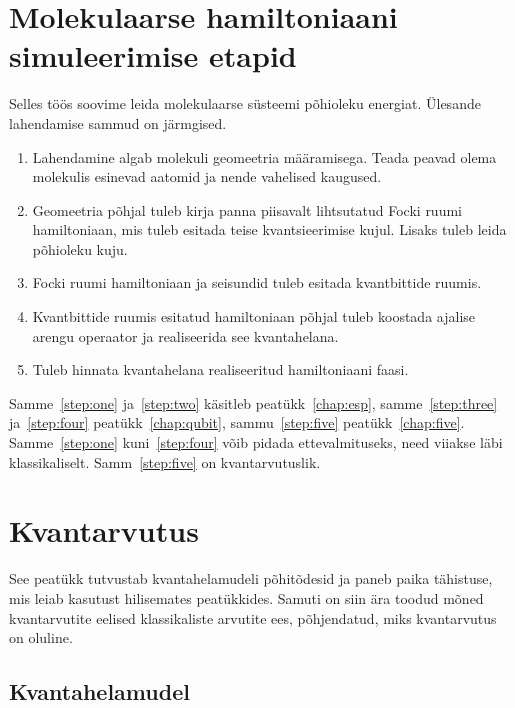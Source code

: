 \documentclass[12pt]{report}
\begin{document}
\tableofcontents

\chapter{Molekulaarse hamiltoniaani simuleerimise etapid}

Selles töös soovime leida molekulaarse süsteemi põhioleku energiat.
Ülesande lahendamise sammud on järmgised.

\begin{enumerate}
    \item\label{step:one} Lahendamine algab molekuli geomeetria määramisega.
    Teada peavad olema molekulis esinevad aatomid ja nende vahelised kaugused.
    \item\label{step:two} Geomeetria põhjal tuleb kirja panna piisavalt lihtsutatud Focki ruumi hamiltoniaan, mis tuleb esitada teise kvantsieerimise kujul.
    Lisaks tuleb leida põhioleku kuju.
    \item\label{step:three} Focki ruumi hamiltoniaan ja seisundid tuleb esitada kvantbittide ruumis.
    \item\label{step:four}  Kvantbittide ruumis esitatud hamiltoniaan põhjal tuleb koostada ajalise arengu operaator ja realiseerida see kvantahelana.
    \item\label{step:five}  Tuleb hinnata kvantahelana realiseeritud hamiltoniaani faasi.
\end{enumerate}

Samme~\ref{step:one} ja~\ref{step:two} käsitleb peatükk~\ref{chap:esp}, samme~\ref{step:three} ja~\ref{step:four} peatükk~\ref{chap:qubit}, sammu~\ref{step:five} peatükk~\ref{chap:five}.
Samme~\ref{step:one} kuni~\ref{step:four} võib pidada ettevalmituseks, need viiakse läbi klassikaliselt.
Samm~\ref{step:five} on kvantarvutuslik.

\chapter{Kvantarvutus}

See peatükk tutvustab kvantahelamudeli põhitõdesid ja paneb paika tähistuse, mis leiab kasutust hilisemates peatükkides.
Samuti on siin ära toodud mõned kvantarvutite eelised klassikaliste arvutite ees, põhjendatud, miks kvantarvutus on oluline.

\section{Kvantahelamudel}
\end{document}
